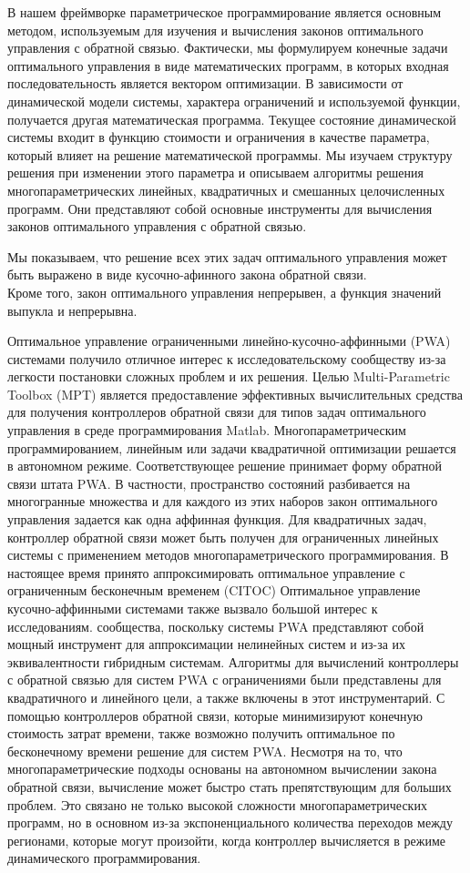 В нашем фреймворке параметрическое программирование является основным методом, используемым для изучения и вычисления законов оптимального управления с обратной связью. Фактически, мы формулируем конечные задачи оптимального управления в виде математических программ, в которых входная последовательность является вектором оптимизации. 
В зависимости от динамической модели системы, характера ограничений и используемой функции, получается другая математическая программа. 
Текущее состояние динамической системы входит в функцию стоимости и ограничения в качестве параметра, который влияет на решение математической программы. 
Мы изучаем структуру решения при изменении этого параметра и описываем алгоритмы решения многопараметрических линейных, квадратичных и смешанных целочисленных программ. 
Они представляют собой основные инструменты для вычисления законов оптимального управления с обратной связью.

Мы показываем, что решение всех этих задач оптимального управления может быть выражено в виде кусочно-афинного закона обратной связи. \\
Кроме того, закон оптимального управления непрерывен, а функция значений выпукла и непрерывна.

Оптимальное управление ограниченными линейно-кусочно-аффинными (PWA) системами получило отличное
интерес к исследовательскому сообществу из-за легкости постановки сложных проблем
и их решения. Целью Multi-Parametric Toolbox (MPT) является предоставление эффективных вычислительных
средства для получения контроллеров обратной связи для типов задач оптимального управления
в среде программирования Matlab. Многопараметрическим программированием, линейным или
задачи квадратичной оптимизации решается в автономном режиме. Соответствующее решение принимает форму
обратной связи штата PWA. В частности, пространство состояний разбивается на многогранные множества и
для каждого из этих наборов закон оптимального управления задается как одна аффинная функция.
Для квадратичных задач, контроллер обратной связи может быть получен для ограниченных
линейных системы с применением методов многопараметрического программирования.
В настоящее время принято аппроксимировать оптимальное управление с ограниченным бесконечным временем (CITOC)
Оптимальное управление кусочно-аффинными системами также вызвало большой интерес к исследованиям.
сообщества, поскольку системы PWA представляют собой мощный инструмент для аппроксимации нелинейных систем и из-за их эквивалентности гибридным системам. Алгоритмы для вычислений
контроллеры с обратной связью для систем PWA с ограничениями были представлены для квадратичного и линейного
цели, а также включены в этот инструментарий.
С помощью контроллеров обратной связи, которые минимизируют конечную стоимость затрат времени, также возможно
получить оптимальное по бесконечному времени решение для систем PWA.
Несмотря на то, что многопараметрические подходы основаны на автономном вычислении закона обратной связи,
вычисление может быстро стать препятствующим для больших проблем. Это связано не только
высокой сложности многопараметрических программ, но в основном из-за
экспоненциального количества переходов между регионами, которые могут произойти, когда контроллер
вычисляется в режиме динамического программирования. 